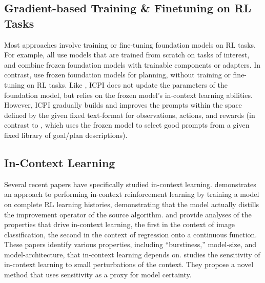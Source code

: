 \documentclass{article}
\begin{document}
\subsection{Gradient-based Training \& Finetuning on RL Tasks}
Most approaches involve training or fine-tuning foundation models on RL tasks.
For example,
\cite{janner_offline_2021,chen_decision_2021,lee_multi-game_2022,xu_prompting_2022,baker_video_2022,reed_generalist_2022}
all use models that are trained from scratch on tasks of interest, and
\cite{singh_know_2022,ahn_as_2022,huang_inner_2022} combine frozen foundation
models with trainable components or adapters. In contrast,
\cite{huang_language_2022} use frozen foundation models for planning, without
training or fine-tuning on RL tasks. Like \cite{huang_language_2022}, ICPI does
not update the parameters of the foundation model, but relies on the frozen model's
in-context learning abilities. However, ICPI gradually builds and improves the
prompts within the space defined by the given fixed text-format for
observations, actions, and rewards (in contrast to \cite{huang_language_2022},
which uses the frozen model to select good prompts from a given fixed library of
goal/plan descriptions).

\subsection{In-Context Learning}
Several recent papers have specifically studied in-context learning.
\cite{laskin2022context} demonstrates an approach to performing in-context
reinforcement learning by training a model on complete RL learning histories,
demonstrating that the model actually distills the improvement operator of the
source algorithm.
\cite{chan_data_2022} and
\cite{garg_what_2022} provide analyses of the properties that drive in-context
learning, the first in the context of image classification, the second in the
context of regression onto a continuous function. These papers identify various
properties, including ``burstiness,'' model-size, and model-architecture, that
in-context learning depends on. \cite{chen_relation_2022} studies the
sensitivity of in-context learning to small perturbations of the context. They
propose a novel method that uses sensitivity as a proxy for model certainty.
\end{document}
